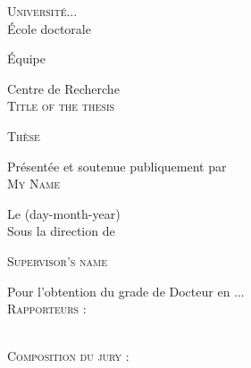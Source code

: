 \documentclass[12pt]{article}
\begin{document}


     \pagestyle{scrheadings}
     \newpage
     \begin{titlepage}

     \begin{center}
      \textsc{\Large Université...}\\[1cm]

      École doctorale 

      Équipe 

     Centre de Recherche \\[1cm]


     \begingroup \linespread{1,75} \selectfont 
     \textsc{\Large Title of the thesis}\\[0,75cm]
      \endgroup


     \begingroup \linespread{1,75} \selectfont 
      \textsc{\LARGE Thèse}\\[0,50cm]
      \endgroup

       Présentée et soutenue publiquement par\\[0,50cm]

       \begingroup \linespread{1,75} \selectfont 
       \textsc{\large My Name}\\[0,50cm]
       \endgroup



       Le (day-month-year)\\[0,50cm]


       Sous la direction de 

       \begingroup \linespread{1,75} \selectfont 
        \textsc{\large Supervisor's name}\\[1cm]
        \endgroup




         Pour l’obtention du grade de Docteur en ...\\[1cm]


         \begingroup \linespread{1,75} \selectfont 
          \textsc{\large Rapporteurs :}\\[0,50cm]
          \endgroup

           \\[0,50cm]

          \begingroup \linespread{1,75} \selectfont 
          \textsc{\large Composition du jury :}\\[0,50cm]
          \endgroup



            \end{center}



             \vfill
             \end{titlepage}
\end{document}
